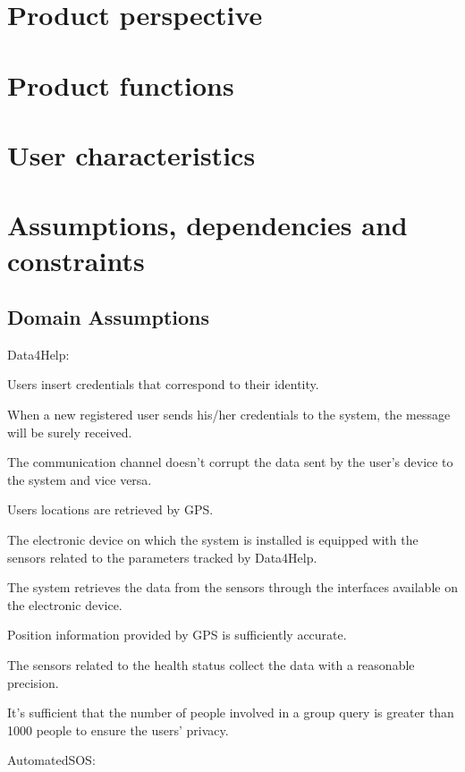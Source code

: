 \section{Product perspective}
\section{Product functions}
\section{User characteristics}
\section{Assumptions, dependencies and constraints}
\subsection{Domain Assumptions}
Data4Help:  
\begin{enumerate} [label={[D\arabic*]}]
    \item Users insert credentials that correspond to their identity.
    \item When a new registered user sends his/her credentials to the system, the message will be surely received.
    \item The communication channel doesn't corrupt the data sent by the user's device to the system and vice versa.
    \item Users locations are retrieved by GPS.
    \item The electronic device on which the system is installed is equipped with the sensors related to the parameters tracked by Data4Help.
    \item The system retrieves the data from the sensors through the interfaces available on the electronic device.
    \item Position information provided by GPS is sufficiently accurate\cite{gps}.
    \item The sensors related to the health status collect the data with a reasonable precision.
    \item It's sufficient that the number of people involved in a group query is greater than 1000 people to ensure the users' privacy.
    \item 
\end{enumerate}  
\noindent
AutomatedSOS:
